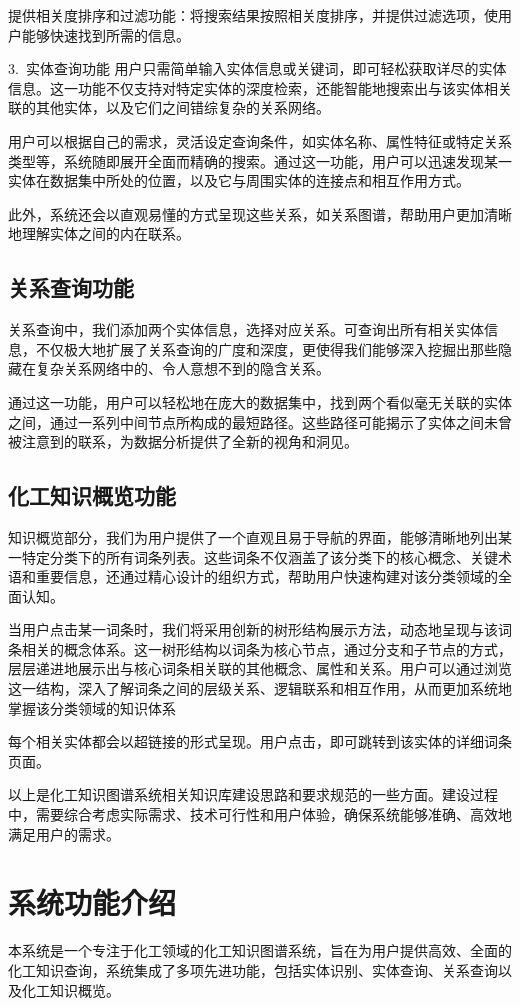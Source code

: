 提供相关度排序和过滤功能：将搜索结果按照相关度排序，并提供过滤选项，使用户能够快速找到所需的信息。 

3.~{实体查询功能} 
用户只需简单输入实体信息或关键词，即可轻松获取详尽的实体信息。这一功能不仅支持对特定实体的深度检索，还能智能地搜索出与该实体相关联的其他实体，以及它们之间错综复杂的关系网络。

用户可以根据自己的需求，灵活设定查询条件，如实体名称、属性特征或特定关系类型等，系统随即展开全面而精确的搜索。通过这一功能，用户可以迅速发现某一实体在数据集中所处的位置，以及它与周围实体的连接点和相互作用方式。

此外，系统还会以直观易懂的方式呈现这些关系，如关系图谱，帮助用户更加清晰地理解实体之间的内在联系。

\subsection{关系查询功能} 
关系查询中，我们添加两个实体信息，选择对应关系。可查询出所有相关实体信息，不仅极大地扩展了关系查询的广度和深度，更使得我们能够深入挖掘出那些隐藏在复杂关系网络中的、令人意想不到的隐含关系。

通过这一功能，用户可以轻松地在庞大的数据集中，找到两个看似毫无关联的实体之间，通过一系列中间节点所构成的最短路径。这些路径可能揭示了实体之间未曾被注意到的联系，为数据分析提供了全新的视角和洞见。

\subsection{化工知识概览功能} 
知识概览部分，我们为用户提供了一个直观且易于导航的界面，能够清晰地列出某一特定分类下的所有词条列表。这些词条不仅涵盖了该分类下的核心概念、关键术语和重要信息，还通过精心设计的组织方式，帮助用户快速构建对该分类领域的全面认知。

当用户点击某一词条时，我们将采用创新的树形结构展示方法，动态地呈现与该词条相关的概念体系。这一树形结构以词条为核心节点，通过分支和子节点的方式，层层递进地展示出与核心词条相关联的其他概念、属性和关系。用户可以通过浏览这一结构，深入了解词条之间的层级关系、逻辑联系和相互作用，从而更加系统地掌握该分类领域的知识体系

每个相关实体都会以超链接的形式呈现。用户点击，即可跳转到该实体的详细词条页面。

以上是化工知识图谱系统相关知识库建设思路和要求规范的一些方面。建设过程中，需要综合考虑实际需求、技术可行性和用户体验，确保系统能够准确、高效地满足用户的需求。

\section{系统功能介绍} 
本系统是一个专注于化工领域的化工知识图谱系统，旨在为用户提供高效、全面的化工知识查询，系统集成了多项先进功能，包括实体识别、实体查询、关系查询以及化工知识概览。

